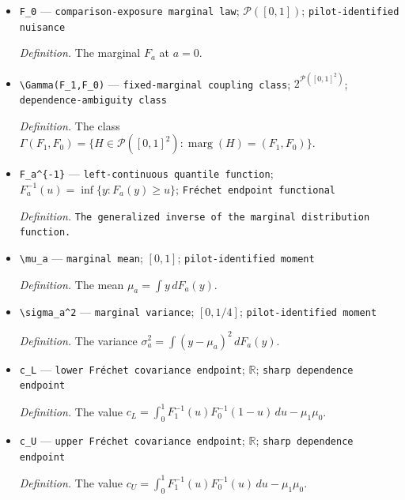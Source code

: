 \documentclass{article}
\begin{document}
\begin{itemize}
  \par\smallskip\noindent\emph{Definition.} The marginal \(F_a\) at \(a=1\).
  \item \texttt{F\_\allowbreak{}0} --- \texttt{comparison-\allowbreak{}exposure marginal law}; \(\mathcal P([0,1])\); \texttt{pilot-\allowbreak{}identified nuisance}
  \par\smallskip\noindent\emph{Definition.} The marginal \(F_a\) at \(a=0\).
  \item \texttt{\textbackslash{}\allowbreak{}Gamma(F\_\allowbreak{}1,\allowbreak{}F\_\allowbreak{}0)} --- \texttt{fixed-\allowbreak{}marginal coupling class}; \(2^{\mathcal P([0,1]^2)}\); \texttt{dependence-\allowbreak{}ambiguity class}
  \par\smallskip\noindent\emph{Definition.} The class \(\Gamma(F_1,F_0)=\{H\in\mathcal P([0,1]^2):\operatorname{marg}(H)=(F_1,F_0)\}\).
  \item \texttt{F\_\allowbreak{}a\textasciicircum{}\{-\allowbreak{}1\}\allowbreak{}} --- \texttt{left-\allowbreak{}continuous quantile function}; \(F_a^{-1}(u)=\inf\{y:F_a(y)\ge u\}\); \texttt{Fréchet endpoint functional}
  \par\smallskip\noindent\emph{Definition.} \texttt{The generalized inverse of the marginal distribution function.}
  \item \texttt{\textbackslash{}\allowbreak{}mu\_\allowbreak{}a} --- \texttt{marginal mean}; \([0,1]\); \texttt{pilot-\allowbreak{}identified moment}
  \par\smallskip\noindent\emph{Definition.} The mean \(\mu_a=\int y\,dF_a(y)\).
  \item \texttt{\textbackslash{}\allowbreak{}sigma\_\allowbreak{}a\textasciicircum{}2} --- \texttt{marginal variance}; \([0,1/4]\); \texttt{pilot-\allowbreak{}identified moment}
  \par\smallskip\noindent\emph{Definition.} The variance \(\sigma_a^2=\int(y-\mu_a)^2\,dF_a(y)\).
  \item \texttt{c\_\allowbreak{}L} --- \texttt{lower Fréchet covariance endpoint}; \(\mathbb R\); \texttt{sharp dependence endpoint}
  \par\smallskip\noindent\emph{Definition.} The value \(c_L=\int_0^1F_1^{-1}(u)F_0^{-1}(1-u)\,du-\mu_1\mu_0\).
  \item \texttt{c\_\allowbreak{}U} --- \texttt{upper Fréchet covariance endpoint}; \(\mathbb R\); \texttt{sharp dependence endpoint}
  \par\smallskip\noindent\emph{Definition.} The value \(c_U=\int_0^1F_1^{-1}(u)F_0^{-1}(u)\,du-\mu_1\mu_0\).

\end{itemize}
\end{document}

